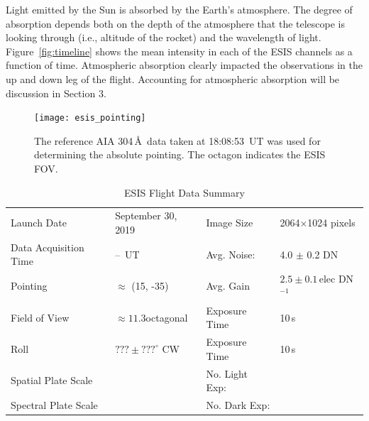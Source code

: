		
		Light emitted by the Sun is absorbed by the Earth's atmosphere.  The degree of absorption depends both on the depth of the atmosphere that the telescope is looking through (i.e., altitude of the rocket) and the wavelength of light.  Figure~\ref{fig:timeline} shows the mean intensity in each of the ESIS channels as a function of time.  Atmospheric absorption clearly impacted the observations in the up and down leg of the flight.  Accounting for atmospheric absorption will be discussion in Section 3.  
		
		
		\begin{figure}[ht]
			\begin{center}
				\texttt{[image: esis\_pointing]}
				\caption{The reference AIA 304\,\AA\ data taken at 18:08:53~UT was used for determining the absolute pointing. The octagon indicates the ESIS FOV.}
				\label{fig:fov}
			\end{center}
		\end{figure}
	

		\begin{table}
		\begin{center}
			\caption{ESIS Flight Data Summary}
			\label{tab:data_info}
			\begin{tabular}{ll|ll}\hline
				Launch Date & September 30, 2019 & Image Size  & 2064$\times$1024 pixels\\
				Data Acquisition Time & \datastart--\datastop~UT & Avg. Noise: & 4.0 $\pm$ 0.2 DN\\
			    Pointing   &  $\approx$ (15\arcsec, -35\arcsec) & Avg. Gain &   $2.5 \pm 0.1$\,elec DN$^{-1}$ \\
				Field of View  & $\approx 11.3$\arcmin octagonal  & Exposure Time & 10\,s \\
				Roll & $??? \pm ???^\circ$ CW & Exposure Time & 10\,s\\
			    Spatial  Plate Scale  &  \rts{\platescalex, \platescaley} & No. Light Exp: &\rts{\numdataframes} \\
				Spectral  Plate Scale  &  \rts{\platescalex, \platescaley} & No. Dark Exp: &\rts{\numdataframes}\\
					\hline
			\end{tabular}
		\end{center}
		\end{table}
		
